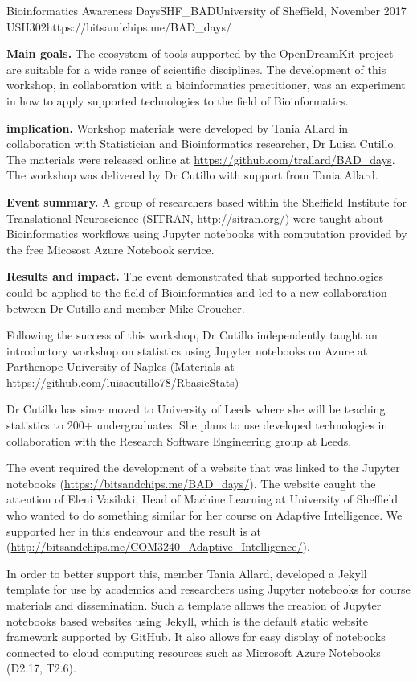 \begin{event}{Bioinformatics Awareness Days}{SHF_BAD}{University of Sheffield, November 2017 }{USH}{30}{2}{https://bitsandchips.me/BAD_days/}

\textbf{Main goals.} The ecosystem of tools supported by the OpenDreamKit project are suitable for a wide range of scientific disciplines. The development of this workshop, in collaboration with a bioinformatics practitioner, was an experiment in how to apply \ODK supported technologies to the field of Bioinformatics.

\textbf{\ODK implication.} Workshop materials were developed by Tania Allard in collaboration with Statistician and Bioinformatics researcher, Dr Luisa Cutillo.  The materials were released online at \url{https://github.com/trallard/BAD_days}. The workshop was delivered by Dr Cutillo with support from Tania Allard.

\textbf{Event summary.} A group of researchers based within the Sheffield Institute for Translational Neuroscience (SITRAN, \url{http://sitran.org/}) were taught about Bioinformatics workflows using Jupyter notebooks with computation provided by the free Micosost Azure Notebook service.

\textbf{Results and impact.} The event demonstrated that \ODK supported technologies could be applied to the field of Bioinformatics and led to a new collaboration between Dr Cutillo and \ODK member Mike Croucher.

Following the success of this workshop, Dr Cutillo independently taught an introductory workshop on statistics using Jupyter notebooks on Azure at Parthenope University of Naples (Materials at \url{https://github.com/luisacutillo78/RbasicStats})

Dr Cutillo has since moved to University of Leeds where she will be teaching statistics to 200+ undergraduates. She plans to use \ODK developed technologies in collaboration with the Research Software Engineering group at Leeds.

The event required the development of a website that was linked to the Jupyter notebooks (\url{https://bitsandchips.me/BAD_days/}). The website caught the attention of Eleni Vasilaki, Head of Machine Learning at University of Sheffield who wanted to do something similar for her course on Adaptive Intelligence. We supported her in this endeavour and the result is at (\url{http://bitsandchips.me/COM3240_Adaptive_Intelligence/}).

In order to better support this, \ODK member Tania Allard, developed a Jekyll template for use by academics and researchers using Jupyter notebooks for course materials and dissemination. Such a template allows the creation of Jupyter notebooks based websites using Jekyll, which is the default static website framework supported by GitHub. It also allows for easy display of notebooks connected to cloud computing resources such as Microsoft Azure Notebooks (D2.17, T2.6).


\end{event}
